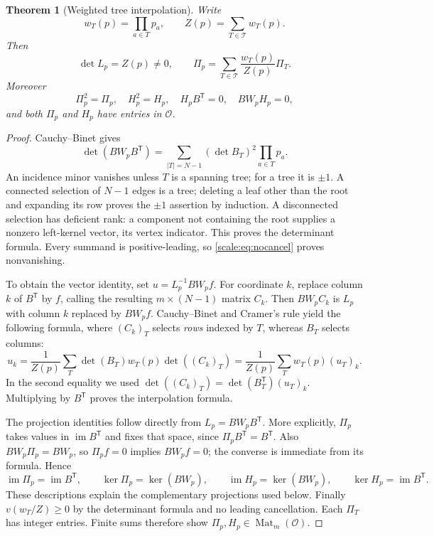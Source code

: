 \documentclass[11pt,a4paper]{article}
\numberwithin{equation}{section}
\newtheorem{theorem}{Theorem}[section]
\theoremstyle{definition}
\newcommand{\OO}{\mathcal O}
\newcommand{\TT}{\mathcal T}
\newcommand{\im}{\operatorname{im}}
\begin{document}
\begin{theorem}[Weighted tree interpolation]\label{scale:thm:tree}
Write
\[
 w_T(p)=\prod_{a\in T}p_a,\qquad Z(p)=\sum_{T\in\TT}w_T(p).
\]
Then
\begin{equation}\label{scale:eq:treeaverage}
 \det L_p=Z(p)\ne0,\qquad
 \Pi_p=\sum_{T\in\TT}\frac{w_T(p)}{Z(p)}\Pi_T.
\end{equation}
Moreover
\begin{equation}\label{scale:eq:projproperties}
 \Pi_p^2=\Pi_p,\quad H_p^2=H_p,\quad
 H_pB^{\mathsf T}=0,\quad BW_pH_p=0,
\end{equation}
and both $\Pi_p$ and $H_p$ have entries in $\OO$.
\end{theorem}
\begin{proof}
Cauchy--Binet gives
\[
 \det(BW_pB^{\mathsf T})
 =\sum_{|T|=N-1}(\det B_T)^2\prod_{a\in T}p_a.
\]
An incidence minor vanishes unless $T$ is a spanning tree; for a tree
it is $\pm1$. A connected selection of $N-1$ edges is a tree;
deleting a leaf other than the root and expanding its row proves the
$\pm1$ assertion by induction. A disconnected selection has deficient
rank: a component not containing the root supplies a nonzero left-kernel
vector, its vertex indicator.
This proves the determinant formula. Every summand is positive-leading,
so \eqref{scale:eq:nocancel} proves nonvanishing.

To obtain the vector identity, set $u=L_p^{-1}BW_pf$.
For coordinate $k$, replace column $k$ of $B^{\mathsf T}$ by $f$,
calling the resulting $m\times(N-1)$ matrix $C_k$. Then $BW_pC_k$
is $L_p$ with column $k$ replaced by $BW_pf$. Cauchy--Binet and
Cramer's rule yield the following formula, where $(C_k)_T$ selects
\emph{rows} indexed by $T$, whereas $B_T$ selects columns:
\[
 u_k=\frac{1}{Z(p)}\sum_T \det(B_T)w_T(p)\det((C_k)_T)
     =\frac{1}{Z(p)}\sum_T w_T(p)(u_T)_k.
\]
In the second equality we used
$\det((C_k)_T)=\det(B_T^{\mathsf T})(u_T)_k$.
Multiplying by $B^{\mathsf T}$ proves the interpolation formula.

The projection identities follow directly from
$L_p=BW_pB^{\mathsf T}$. More explicitly, $\Pi_p$ takes values in
$\im B^{\mathsf T}$ and fixes that space, since
$\Pi_pB^{\mathsf T}=B^{\mathsf T}$. Also
$BW_p\Pi_p=BW_p$, so $\Pi_pf=0$ implies $BW_pf=0$; the converse
is immediate from its formula. Hence
\[
 \im\Pi_p=\im B^{\mathsf T},\qquad
 \ker\Pi_p=\ker(BW_p),\qquad
 \im H_p=\ker(BW_p),\qquad
 \ker H_p=\im B^{\mathsf T}.
\]
These descriptions explain the complementary projections used below.
Finally $v(w_T/Z)\geq0$ by the determinant formula and no leading
cancellation. Each $\Pi_T$ has integer entries. Finite sums therefore
show $\Pi_p,H_p\in\operatorname{Mat}_m(\OO)$.
\end{proof}
\end{document}
